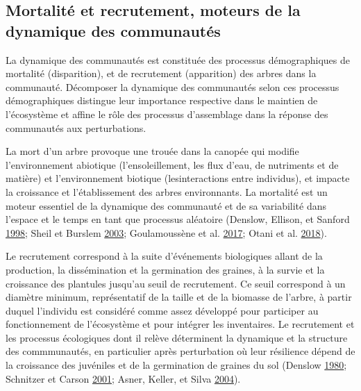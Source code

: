 \documentclass[11pt,french,A4paper,extrafontsizes,onecolumn,openright]{memoir}
\begin{document}
\subsection{Mortalité et recrutement, moteurs de la dynamique des
communautés}\label{mortalite-et-recrutement-moteurs-de-la-dynamique-des-communautes}

La dynamique des communautés est constituée des processus démographiques
de mortalité (disparition), et de recrutement (apparition) des arbres
dans la communauté. Décomposer la dynamique des communautés selon ces
processus démographiques distingue leur importance respective dans le
maintien de l'écosystème et affine le rôle des processus d'assemblage
dans la réponse des communautés aux perturbations.

La mort d'un arbre provoque une trouée dans la canopée qui modifie
l'environnement abiotique (l'ensoleillement, les flux d'eau, de
nutriments et de matière) et l'environnement biotique (lesinteractions
entre individus), et impacte la croissance et l'établissement des arbres
environnants. La mortalité est un moteur essentiel de la dynamique des
communauté et de sa variabilité dans l'espace et le temps en tant que
processus aléatoire (Denslow, Ellison, et Sanford
\protect\hyperlink{ref-Denslow1998}{1998}; Sheil et Burslem
\protect\hyperlink{ref-Sheil2003}{2003}; Goulamoussène et al.
\protect\hyperlink{ref-Goulamoussene2017}{2017}; Otani et al.
\protect\hyperlink{ref-Otani2018}{2018}).

Le recrutement correspond à la suite d'événements biologiques allant de
la production, la dissémination et la germination des graines, à la
survie et la croissance des plantules jusqu'au seuil de recrutement. Ce
seuil correspond à un diamètre minimum, représentatif de la taille et de
la biomasse de l'arbre, à partir duquel l'individu est considéré comme
assez développé pour participer au fonctionnement de l'écosystème et
pour intégrer les inventaires. Le recrutement et les processus
écologiques dont il relève déterminent la dynamique et la structure des
commmunautés, en particulier après perturbation où leur résilience
dépend de la croissance des juvéniles et de la germination de graines du
sol (Denslow \protect\hyperlink{ref-Denslow1980}{1980}; Schnitzer et
Carson \protect\hyperlink{ref-Schnitzer2001}{2001}; Asner, Keller, et
Silva \protect\hyperlink{ref-Asner2004}{2004}).
\end{document}
